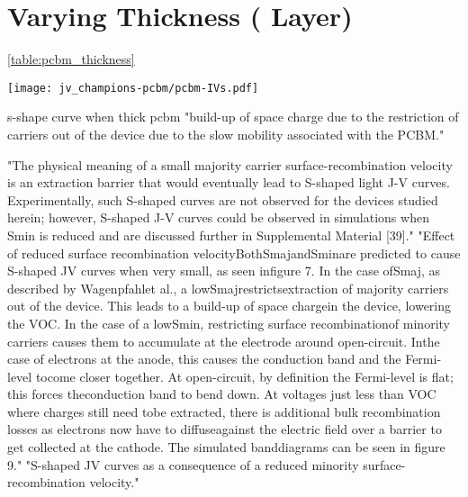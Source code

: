 \section{Varying  Thickness ( Layer)}

\cref{table:pcbm_thickness}

\begin{SCfigure}
	\centering
	\texttt{[image: jv\_champions-pcbm/pcbm-IVs.pdf]}
	\label{fig:jv_champions-pcbm}
\end{SCfigure}




s-shape curve when thick pcbm \cite{Wheeler2017} "build-up of space charge due to the restriction of carriers out of the device due to the slow mobility associated with the PCBM."


"The physical meaning of a small majority carrier surface-recombination velocity is an extraction barrier that would eventually lead to S-shaped light J-V curves. Experimentally, such S-shaped curves are not observed for the devices studied herein; however, S-shaped J-V curves could be observed in simulations when Smin is reduced and are discussed further in Supplemental Material [39]."
"Effect of reduced surface recombination velocityBothSmajandSminare predicted to cause S-shaped JV curves when very small, as seen infigure 7.  In the case ofSmaj,  as described by Wagenpfahlet al.,  a lowSmajrestrictsextraction of majority carriers out of the device.  This leads to a build-up of space chargein the device, lowering the VOC.  In the case of a lowSmin, restricting surface recombinationof  minority  carriers  causes  them  to  accumulate  at  the  electrode  around  open-circuit.   Inthe case of electrons at the anode, this causes the conduction band and the Fermi-level tocome closer together.  At open-circuit, by definition the Fermi-level is flat;  this forces theconduction band to bend down.  At voltages just less than VOC where charges still need tobe extracted, there is additional bulk recombination losses as electrons now have to diffuseagainst the electric field over a barrier to get collected at the cathode.  The simulated banddiagrams can be seen in figure 9."
"S-shaped JV curves as a consequence of a reduced minority surface-recombination velocity." \cite{Wheeler2015}


